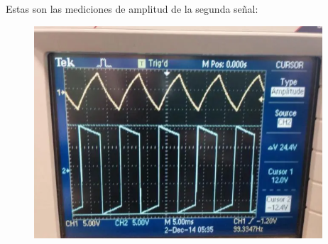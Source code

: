 \documentclass[12pt]{article}
\begin{document}

\par


\vspace{\baselineskip}

\vspace{\baselineskip}

\vspace{\baselineskip}

\vspace{\baselineskip}

\vspace{\baselineskip}

\vspace{\baselineskip}

\vspace{\baselineskip}

\vspace{\baselineskip}

\vspace{\baselineskip}

\vspace{\baselineskip}
\begin{Center}
\textcolor[HTML]{656565}{Estas son las mediciones de amplitud de la segunda señal:}
\end{Center}\par




\begin{figure}[H]
	\begin{Center}
		\includegraphics[width=4.23in,height=3.12in]{./media/image17.png}
	\end{Center}
\end{figure}
\end{document}
